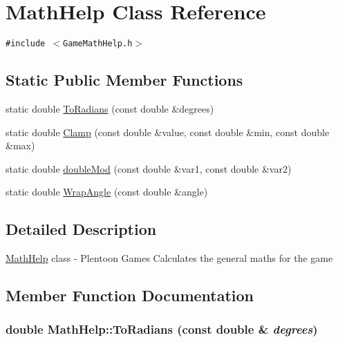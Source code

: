 \hypertarget{class_math_help}{
\section{MathHelp Class Reference}
\label{class_math_help}
}
{\tt \#include $<$GameMathHelp.h$>$}

\subsection*{Static Public Member Functions}
\begin{CompactItemize}
\item 
static double \hyperlink{class_math_help_a461a348946dded19ccd4dc7b5bcbe02}{ToRadians} (const double \&degrees)
\item 
static double \hyperlink{class_math_help_7a9a497d7adc9bd092e169640b2d2eb2}{Clamp} (const double \&value, const double \&min, const double \&max)
\item 
static double \hyperlink{class_math_help_b6bb2a6e426ce4c8971a54a061034f63}{doubleMod} (const double \&var1, const double \&var2)
\item 
static double \hyperlink{class_math_help_0309ea177d12b3dcf8c0d537d02e3b33}{WrapAngle} (const double \&angle)
\end{CompactItemize}


\subsection{Detailed Description}
\hyperlink{class_math_help}{MathHelp} class - Plentoon Games Calculates the general maths for the game 

\subsection{Member Function Documentation}
\hypertarget{class_math_help_a461a348946dded19ccd4dc7b5bcbe02}{
\subsubsection[ToRadians]{\setlength{\rightskip}{0pt plus 5cm}double MathHelp::ToRadians (const double \& {\em degrees})}}
\label{class_math_help_a461a348946dded19ccd4dc7b5bcbe02}


